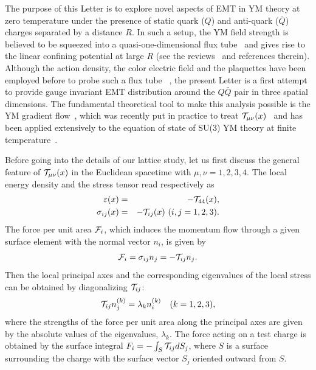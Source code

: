 \documentclass[3p,twocolumn,sort&compress]{elsarticle}
\begin{document}
The purpose of this Letter is to explore novel aspects of EMT
in YM theory at zero temperature under the presence of static quark ($Q$) and anti-quark ($\bar{Q}$)
charges separated by a distance $R$.
In such a setup, the YM field strength is believed to be squeezed into a quasi-one-dimensional
flux tube~\cite{Nambu} and gives rise to the linear confining potential at large $R$
(see the reviews~\cite{Bali:2000gf,Greensite,Kondo:2014sta} and references therein).
Although the action density, the color electric field and the plaquettes 
 have been employed before to probe such a flux tube
 ~\cite{DiGiacomo:1990hc,Bali:1994de,Michael:1995pv,Green:1996be,Gliozzi:2010zv,Meyer:2010tw,Cea:2012qw,Cardoso:2013lla},
the present Letter is a first attempt to provide  gauge invariant 
EMT distribution  around the $Q\bar{Q}$ pair in three spatial dimensions.
The fundamental theoretical tool to make this
analysis possible is the YM gradient flow~\cite{Narayanan:2006rf,Luscher:2010iy,Luscher:2011bx},
which was recently put in practice to treat ${\cal T}_{\mu \nu}(x)$~\cite{Suzuki:2013gza,Suzuki:2016ytc}
and has been applied extensively to the equation of state of SU(3) YM theory
at finite temperature~\cite{Asakawa:2013laa,Kitazawa:2016dsl,Kamata:2016any,Kitazawa:2017qab}.

Before going into the details of our lattice study, let us first discuss
the general feature of ${\cal T}_{\mu \nu}(x)$ in the Euclidean spacetime
with $\mu,\nu=1,2,3,4$.
The local energy density and  the stress tensor read respectively as 
\begin{eqnarray}
 \varepsilon (x) &=& -  {\cal T}_{44}(x), \\
 \sigma_{ij} (x) &=& - {\cal T}_{ij}(x)\ (i,j=1,2,3).
\end{eqnarray}
The force per unit area ${\cal F}_i$,
which induces the momentum flow through a given
surface element with the normal vector $n_i$, is given by \cite{Landau}
\begin{eqnarray}
{\cal F}_i =  \sigma_{ij}n_j =  - {\cal T}_{ij} n_j.
\label{eq:F=Tn}
\end{eqnarray} 
Then the  local  principal axes and the corresponding eigenvalues
of the local stress can be obtained  by diagonalizing ${\cal T}_{ij}$:
\begin{align}
{\cal T}_{ij}n_j^{(k)}=\lambda_k n_i^{(k)} \quad (k=1,2,3),
\label{eq:EV}
\end{align}
where the strengths of the force per unit area
along the
principal axes are given by the absolute values of the
eigenvalues, $\lambda_k $.
The force acting on a test charge is
obtained by the surface integral ${F}_i =- \int_S {\cal T}_{ij} dS_j$, where $S$ is a surface surrounding the charge with the surface vector $S_j$ oriented  outward from $S$.
\end{document}
